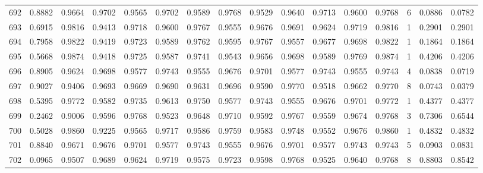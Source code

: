 \begin{tabular}{lrrrrrrrrrrrrrrr}
692 &      0.8882 &  0.9664 &  0.9702 &  0.9565 &  0.9702 &  0.9589 &  0.9768 &  0.9529 &  0.9640 &  0.9713 &   0.9600 &     0.9768 &      6 &                    0.0886 &                     0.0782 \\
693 &      0.6915 &  0.9816 &  0.9413 &  0.9718 &  0.9600 &  0.9767 &  0.9555 &  0.9676 &  0.9691 &  0.9624 &   0.9719 &     0.9816 &      1 &                    0.2901 &                     0.2901 \\
694 &      0.7958 &  0.9822 &  0.9419 &  0.9723 &  0.9589 &  0.9762 &  0.9595 &  0.9767 &  0.9557 &  0.9677 &   0.9698 &     0.9822 &      1 &                    0.1864 &                     0.1864 \\
695 &      0.5668 &  0.9874 &  0.9418 &  0.9725 &  0.9587 &  0.9741 &  0.9543 &  0.9656 &  0.9698 &  0.9589 &   0.9769 &     0.9874 &      1 &                    0.4206 &                     0.4206 \\
696 &      0.8905 &  0.9624 &  0.9698 &  0.9577 &  0.9743 &  0.9555 &  0.9676 &  0.9701 &  0.9577 &  0.9743 &   0.9555 &     0.9743 &      4 &                    0.0838 &                     0.0719 \\
697 &      0.9027 &  0.9406 &  0.9693 &  0.9669 &  0.9690 &  0.9631 &  0.9696 &  0.9590 &  0.9770 &  0.9518 &   0.9662 &     0.9770 &      8 &                    0.0743 &                     0.0379 \\
698 &      0.5395 &  0.9772 &  0.9582 &  0.9735 &  0.9613 &  0.9750 &  0.9577 &  0.9743 &  0.9555 &  0.9676 &   0.9701 &     0.9772 &      1 &                    0.4377 &                     0.4377 \\
699 &      0.2462 &  0.9006 &  0.9596 &  0.9768 &  0.9523 &  0.9648 &  0.9710 &  0.9592 &  0.9767 &  0.9559 &   0.9674 &     0.9768 &      3 &                    0.7306 &                     0.6544 \\
700 &      0.5028 &  0.9860 &  0.9225 &  0.9565 &  0.9717 &  0.9586 &  0.9759 &  0.9583 &  0.9748 &  0.9552 &   0.9676 &     0.9860 &      1 &                    0.4832 &                     0.4832 \\
701 &      0.8840 &  0.9671 &  0.9676 &  0.9701 &  0.9577 &  0.9743 &  0.9555 &  0.9676 &  0.9701 &  0.9577 &   0.9743 &     0.9743 &      5 &                    0.0903 &                     0.0831 \\
702 &      0.0965 &  0.9507 &  0.9689 &  0.9624 &  0.9719 &  0.9575 &  0.9723 &  0.9598 &  0.9768 &  0.9525 &   0.9640 &     0.9768 &      8 &                    0.8803 &                     0.8542 \\

\end{tabular}

